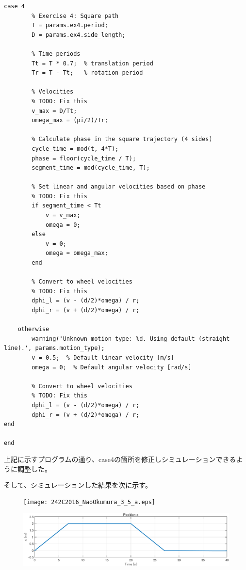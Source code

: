\documentclass[10pt,a4paper,titlepage]{jreport} %
\begin{document}
\begin{lstlisting}[caption=modified＿mobile＿robot＿controller.m]
    case 4
        % Exercise 4: Square path
        T = params.ex4.period;
        D = params.ex4.side_length;
        
        % Time periods
        Tt = T * 0.7;  % translation period
        Tr = T - Tt;   % rotation period
        
        % Velocities
        % TODO: Fix this
        v_max = D/Tt;
        omega_max = (pi/2)/Tr;
        
        % Calculate phase in the square trajectory (4 sides)
        cycle_time = mod(t, 4*T);
        phase = floor(cycle_time / T);
        segment_time = mod(cycle_time, T);
        
        % Set linear and angular velocities based on phase
        % TODO: Fix this
        if segment_time < Tt
            v = v_max;
            omega = 0;
        else
            v = 0;
            omega = omega_max;
        end
        
        % Convert to wheel velocities
        % TODO: Fix this
        dphi_l = (v - (d/2)*omega) / r;
        dphi_r = (v + (d/2)*omega) / r;
        
    otherwise
        warning('Unknown motion type: %d. Using default (straight line).', params.motion_type);
        v = 0.5;  % Default linear velocity [m/s]
        omega = 0;  % Default angular velocity [rad/s]
        
        % Convert to wheel velocities
        % TODO: Fix this
        dphi_l = (v - (d/2)*omega) / r;
        dphi_r = (v + (d/2)*omega) / r;
end

end

\end{lstlisting}

上記に示すプログラムの通り、case4の箇所を修正しシミュレーションできるように調整した。

そして、シミュレーションした結果を次に示す。

\begin{figure}[H] %
  \centering
  \texttt{[image: 242C2016\_NaoOkumura\_3\_5\_a.eps]} %
\end{figure}

\begin{figure}[H] %
  \centering
  \includegraphics[width=0.6\linewidth]{242C2016_NaoOkumura_3_5_b.eps} %
\end{figure}
\end{document}
